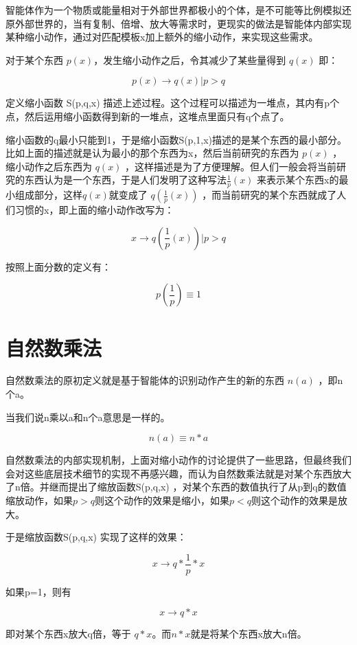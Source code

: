 \documentclass[12pt,oneside]{book}
\begin{document}
智能体作为一个物质或能量相对于外部世界都极小的个体，是不可能等比例模拟还原外部世界的，当有复制、倍增、放大等需求时，更现实的做法是智能体内部实现某种缩小动作，通过对匹配模板x加上额外的缩小动作，来实现这些需求。

对于某个东西 $p(x)$，发生缩小动作之后，令其减少了某些量得到 $q(x)$ 即：

\[
p(x) \to q(x)   | p>q
\]


定义缩小函数 S(p,q,x) 描述上述过程。这个过程可以描述为一堆点，其内有p个点，然后运用缩小函数得到新的一堆点，这堆点里面只有q个点了。

缩小函数的q最小只能到1，于是缩小函数S(p,1,x)描述的是某个东西的最小部分。比如上面的描述就是认为最小的那个东西为x，然后当前研究的东西为 $p(x)$ ，缩小动作之后东西为 $q(x)$ ，这样描述是为了方便理解。但人们一般会将当前研究的东西认为是一个东西，于是人们发明了这种写法$\frac{1}{p}(x)$ 来表示某个东西x的最小组成部分，这样$q(x)$就变成了 $q(\frac{1}{p}(x))$ ，而当前研究的某个东西就成了人们习惯的x，即上面的缩小动作改写为：


\[
x \to q(\frac{1}{p}(x))   | p>q
\]

按照上面分数的定义有：

\begin{equation}
p(\frac{1}{p}) \equiv 1
\end{equation}





\section{自然数乘法}
自然数乘法的原初定义就是基于智能体的识别动作产生的新的东西 $n(a)$ ，即n个a。

当我们说n乘以a和n个a意思是一样的。

\[
n(a) \equiv n*a
\]

自然数乘法的内部实现机制，上面对缩小动作的讨论提供了一些思路，但最终我们会对这些底层技术细节的实现不再感兴趣，而认为自然数乘法就是对某个东西放大了n倍。并继而提出了缩放函数S(p,q,x) ，对某个东西的数值执行了从p到q的数值缩放动作，如果$p>q$则这个动作的效果是缩小，如果$p<q$则这个动作的效果是放大。

于是缩放函数S(p,q,x) 实现了这样的效果：

\[
x \to q*\frac{1}{p}*x
\]

如果p=1，则有

\[
x \to q*x
\]

即对某个东西x放大q倍，等于 $q*x$。而$n*x$就是将某个东西x放大n倍。
\end{document}

